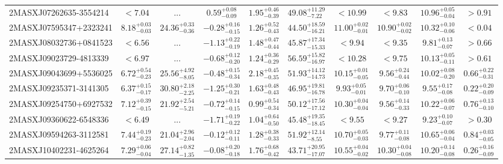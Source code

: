 \documentclass[onecolumn]{mn2e}
\begin{document}
\begin{landscape}
{\begin{center}
\begin{longtable}{lccccccccc}
2MASXJ07262635-3554214 & $<7.04$ & ... & $0.59_{-0.09}^{+0.08}$ & $1.95_{-0.39}^{+0.46}$ &$49.08_{-7.22}^{+11.29}$ & $<10.99$ & $<9.83$ & $10.96_{-0.04}^{+0.05}$ & $>0.91$ \\
2MASXJ07595347+2323241 & $8.18_{-0.03}^{+0.03}$ & $24.36_{-0.36}^{+0.33}$ & $-0.28_{-0.15}^{+0.16}$ & $1.26_{-0.43}^{+0.52}$ &$44.50_{-16.21}^{+18.59}$ & $11.00_{-0.01}^{+0.02}$ & $10.90_{-0.02}^{+0.02}$ & $10.32_{-0.06}^{+0.10}$ & $<0.04$ \\
2MASXJ08032736+0841523 & $<6.56$ & ... & $-1.13_{-0.19}^{+0.22}$ & $1.48_{-0.44}^{+0.47}$ &$45.87_{-15.33}^{+17.34}$ & $<9.94$ & $<9.35$ & $9.81_{-0.07}^{+0.13}$ & $>0.66$ \\
2MASXJ09023729-4813339 & $<6.97$ & ... & $-0.68_{-0.20}^{+0.12}$ & $1.24_{-0.29}^{+0.36}$ &$56.59_{-16.97}^{+15.82}$ & $<10.28$ & $<9.75$ & $10.13_{-0.11}^{+0.05}$ & $>0.61$ \\
2MASXJ09043699+5536025 & $6.72_{-0.23}^{+0.54}$ & $25.56_{-8.05}^{+4.92}$ & $-0.48_{-0.34}^{+0.15}$ & $2.18_{-0.35}^{+0.45}$ &$51.93_{-14.73}^{+14.12}$ & $10.15_{-0.05}^{+0.01}$ & $9.56_{-0.44}^{+0.24}$ & $10.02_{-0.20}^{+0.08}$ & $0.66_{-0.31}^{+0.22}$ \\
2MASXJ09235371-3141305 & $6.37_{-0.17}^{+0.15}$ & $30.80_{-2.25}^{+2.18}$ & $-1.25_{-0.21}^{+0.30}$ & $1.63_{-0.43}^{+0.48}$ &$46.95_{-16.78}^{+19.81}$ & $9.93_{-0.01}^{+0.05}$ & $9.70_{-0.10}^{+0.06}$ & $9.55_{-0.08}^{+0.17}$ & $0.22_{-0.09}^{+0.20}$ \\
2MASXJ09254750+6927532 & $7.12_{-0.15}^{+0.39}$ & $21.92_{-5.21}^{+2.54}$ & $-0.72_{-0.15}^{+0.14}$ & $0.99_{-0.34}^{+0.54}$ &$50.12_{-17.12}^{+17.56}$ & $10.30_{-0.04}^{+0.04}$ & $9.56_{-0.33}^{+0.14}$ & $10.22_{-0.07}^{+0.06}$ & $0.76_{-0.10}^{+0.13}$ \\
2MASXJ09360622-6548336 & $<6.49$ & ... & $-1.71_{-0.22}^{+0.19}$ & $1.04_{-0.50}^{+0.64}$ &$45.48_{-18.45}^{+19.35}$ & $<9.55$ & $<9.27$ & $9.23_{-0.07}^{+0.10}$ & $>0.30$ \\
2MASXJ09594263-3112581 & $7.44_{-0.23}^{+0.19}$ & $21.04_{-2.04}^{+2.96}$ & $-0.12_{-0.11}^{+0.12}$ & $1.28_{-0.33}^{+0.38}$ &$51.92_{-8.55}^{+12.14}$ & $10.70_{-0.03}^{+0.05}$ & $9.77_{-0.08}^{+0.11}$ & $10.65_{-0.04}^{+0.06}$ & $0.84_{-0.05}^{+0.03}$ \\
2MASXJ10402231-4625264 & $7.29_{-0.04}^{+0.06}$ & $27.14_{-1.35}^{+0.82}$ & $-0.08_{-0.18}^{+0.20}$ & $1.76_{-0.42}^{+0.68}$ &$43.71_{-17.07}^{+20.95}$ & $10.55_{-0.02}^{+0.04}$ & $10.30_{-0.08}^{+0.04}$ & $10.20_{-0.08}^{+0.14}$ & $0.26_{-0.09}^{+0.16}$ \\

\end{longtable}
\end{center}}
\end{landscape}
\end{document}
